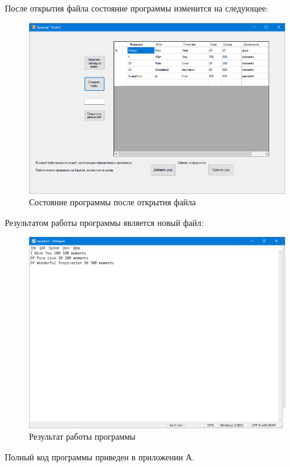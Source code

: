 После открытия файла состояние программы изменится на следующее:
\begin{figure}[H]
    \centering
    \includegraphics[scale=0.4]{task8/openFile.png}
    \caption{Состояние программы после открытия файла}
\end{figure}

Результатом работы программы является новый файл:
\begin{figure}[H]
    \centering
    \includegraphics[scale=0.4]{task8/result.png}
    \caption{Результат работы программы}
\end{figure}

Полный код программы приведен в приложении А.

